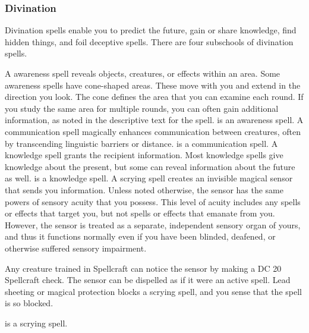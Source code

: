 \subsubsection{Divination}
Divination spells enable you to predict the future, gain or share knowledge, find hidden things, and foil deceptive spells. There are four subschools of divination spells.

 A awareness spell reveals objects, creatures, or effects within an area. Some awareness spells have cone-shaped areas. These move with you and extend in the direction you look. The cone defines the area that you can examine each round. If you study the same area for multiple rounds, you can often gain additional information, as noted in the descriptive text for the spell.  is an awareness spell.
 A communication spell magically enhances communication between creatures, often by transcending linguistic barriers or distance.  is a communication spell.
 A knowledge spell grants the recipient information. Most knowledge spells give knowledge about the present, but some can reveal information about the future as well.  is a knowledge spell.
 A scrying spell creates an invisible magical sensor that sends you information. Unless noted otherwise, the sensor has the same powers of sensory acuity that you possess. This level of acuity includes any spells or effects that target you, but not spells or effects that emanate from you. However, the sensor is treated as a separate, independent sensory organ of yours, and thus it functions normally even if you have been blinded, deafened, or otherwise suffered sensory impairment.
\par Any creature trained in Spellcraft can notice the sensor by making a DC 20 Spellcraft check. The sensor can be dispelled as if it were an active spell. Lead sheeting or magical protection blocks a scrying spell, and you sense that the spell is so blocked.
\par {} is a scrying spell.

